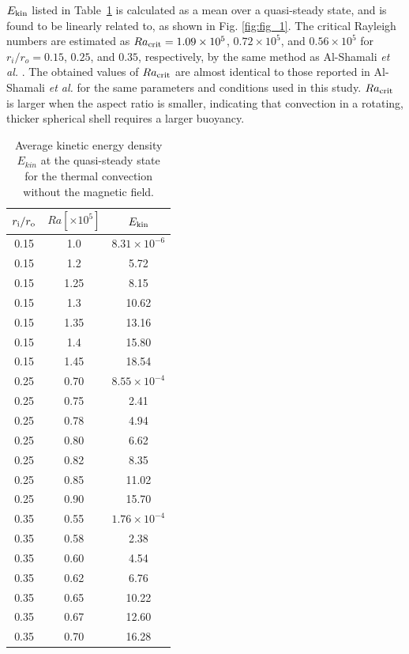 $E_{\rm kin}$ listed in Table~\ref{table:Rac} is calculated as a mean over a quasi-steady state, and is found to be linearly related to, as shown in Fig. \ref{fig:fig_1}.
The critical Rayleigh numbers are estimated as $Ra_{\rm crit} = 1.09 \times 10^5$, $0.72 \times 10^5$, and $0.56 \times 10^5$ for $r_i/r_o = 0.15$, $0.25$, and $0.35$, respectively, by the same method as Al-Shamali {\it et al.} . 
The obtained values of $Ra_{\rm crit}$ are almost identical to those reported in Al-Shamali {\it et al.}  for the same parameters and conditions used in this study. 
{\color{red} %
$Ra_{\rm crit}$ is larger when the aspect ratio is smaller, indicating that convection in a rotating, thicker spherical shell requires a larger buoyancy.
}
%
%
\begin{table}
\caption{Average kinetic energy density $E_{kin}$ at the quasi-steady state \\
for the thermal convection without the magnetic field.}
\begin{center}
\begin{tabular}{|ccc||}
   \hline
  $r_{\rm i}/r_{\rm o}$ & $Ra[\times 10^5] $ &  $E_{\rm kin}$ \\
    \hline
 0.15  &  1.0  &  $8.31 \times 10^{-6}$ \\
 0.15  &  1.2  &  5.72 \\
 0.15  &  1.25 &  8.15 \\
 0.15  &  1.3  &  10.62 \\
 0.15  &  1.35 &  13.16 \\
 0.15  &  1.4  &  15.80 \\
 0.15  &  1.45  &  18.54 \\
 \hline
%
 0.25  &  0.70 &  $8.55 \times 10^{-4}$ \\
 0.25  &  0.75 &  2.41 \\
 0.25  &  0.78  &  4.94 \\
 0.25  &  0.80  &  6.62 \\
 0.25  &  0.82  & 8.35 \\
 0.25  &  0.85  &  11.02 \\
 0.25  &  0.90  &  15.70 \\
 \hline
%
 0.35  &  0.55  &  $1.76 \times 10^{-4}$ \\
 0.35  &  0.58  &  2.38  \\
 0.35  &  0.60  &  4.54  \\
 0.35  &  0.62  &  6.76 \\
 0.35  &  0.65  &  10.22 \\
 0.35  &  0.67  &  12.60\\
 0.35  &  0.70  &  16.28 \\
 \hline
\end{tabular}
\end{center}
\label{table:Rac}
\end{table}


